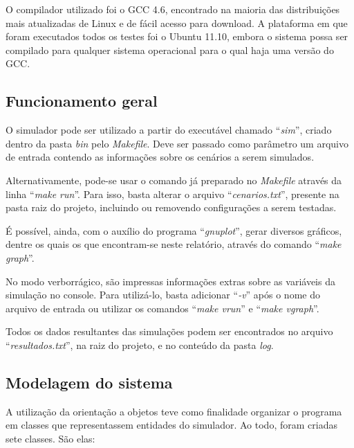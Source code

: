 \documentclass[a4paper,10pt]{article}
\begin{document}
O compilador utilizado foi o GCC 4.6, encontrado na maioria das distribuições mais atualizadas de Linux e de fácil acesso para download. A plataforma em que foram executados todos os testes foi o Ubuntu 11.10, embora o sistema possa ser compilado para qualquer sistema operacional para o qual haja uma versão do GCC.

\subsection{Funcionamento geral}

O simulador pode ser utilizado a partir do executável chamado ``\textit{sim}'', criado dentro da pasta \textit{bin} pelo \textit{Makefile}. Deve ser passado como parâmetro um arquivo de entrada contendo as informações sobre os cenários a serem simulados.

Alternativamente, pode-se usar o comando já preparado no \textit{Makefile} através da linha ``\textit{make run}''. Para isso, basta alterar o arquivo ``\textit{cenarios.txt}'', presente na pasta raiz do projeto, incluindo ou removendo configurações a serem testadas.

É possível, ainda, com o auxílio do programa ``\textit{gnuplot}'', gerar diversos gráficos, dentre os quais os que encontram-se neste relatório, através do comando ``\textit{make graph}''.

No modo verborrágico, são impressas informações extras sobre as variáveis da simulação no console. Para utilizá-lo, basta adicionar ``\textit{-v}'' após o nome do arquivo de entrada ou utilizar os comandos ``\textit{make vrun}'' e ``\textit{make vgraph}''.

Todos os dados resultantes das simulações podem ser encontrados no arquivo ``\textit{resultados.txt}'', na raiz do projeto, e no conteúdo da pasta \textit{log}.

\subsection{Modelagem do sistema}

A utilização da orientação a objetos teve como finalidade organizar o programa em classes que representassem entidades do simulador. Ao todo, foram criadas sete classes. São elas:
\end{document}
